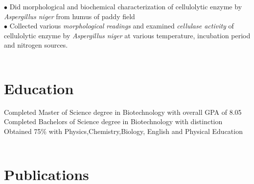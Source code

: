 \documentclass[letterpaper]{twentysecondcv} %
\begin{document}
\begin{twenty}
	{$\bullet$ Did morphological and biochemical characterization of cellulolytic \phantom{ix}enzyme by \emph{Aspergillus niger} from humus of paddy field\\
	$\bullet$ Collected various\emph{ morphological readings} and examined \emph{cellulase  \phantom{ix}activity} of cellulolytic enzyme by \emph{Aspergillus niger} at various \phantom{ix}temperature, incubation period and nitrogen sources.\\\\
	}

\end{twenty}



\section{Education}

\begin{twenty} %
	{Completed Master of Science degree in Biotechnology with overall GPA of 8.05 }
	{Completed Bachelors of Science degree in Biotechnology with distinction}
	{Obtained 75\% with Physics,Chemistry,Biology, English and Physical Education\\\\ }
\end{twenty}

\iffalse
\section{Publications}
\end{document}
